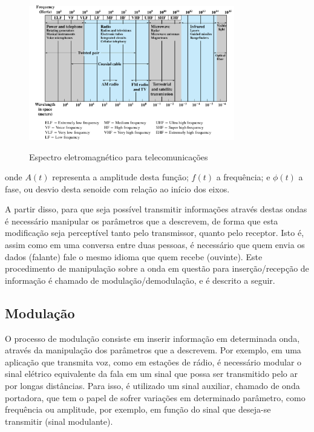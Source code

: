 \documentclass[oneside,openright,12pt]{ufsm_2015} %
\begin{document}
\begin{figure}[ht]
     \caption{\label{exepretex} Espectro eletromagnético para telecomunicações}
\centering
\includegraphics[width=0.8\textwidth]{figuras/espectro.png}
\vspace{\baselineskip} %
    \label{fig:espectro}
\end{figure}


onde $A(t)$ representa a amplitude desta função; $f(t)$ a frequência; e $\phi (t)$ a fase, ou desvio desta senoide com relação ao início dos eixos.

A partir disso, para que seja possível transmitir informações através destas ondas é necessário manipular os parâmetros que a descrevem, de forma que esta modificação seja perceptível tanto pelo transmissor, quanto pelo receptor. Isto é, assim como em uma conversa entre duas pessoas, é necessário que quem envia os dados (falante) fale o mesmo idioma que quem recebe (ouvinte). Este procedimento de manipulação sobre a onda em questão para inserção/recepção de informação é chamado de modulação/demodulação, e é descrito a seguir.

\subsection{Modulação}
O processo de modulação consiste em inserir informação em determinada onda, através da manipulação dos parâmetros que a descrevem. Por exemplo, em uma aplicação que transmita voz, como em estações de rádio, é necessário modular o sinal elétrico equivalente da fala em um sinal que possa ser transmitido pelo ar por longas distâncias. Para isso, é utilizado um sinal auxiliar, chamado de onda portadora, que tem o papel de sofrer variações em determinado parâmetro, como frequência ou amplitude, por exemplo, em função do sinal que deseja-se transmitir (sinal modulante). 
\end{document}
